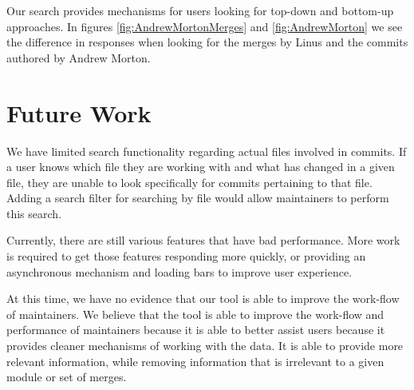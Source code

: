 \documentclass[conference, draftclsnofoot]{IEEEtran}
\begin{document}
Our search provides mechanisms for users looking for top-down and bottom-up
approaches. In figures \ref{fig:AndrewMortonMerges} and \ref{fig:AndrewMorton}
we see the difference in responses when looking for the merges by Linus and the
commits authored by Andrew Morton.


%



\section{Future Work}
We have limited search functionality regarding actual files involved in
commits. If a user knows which file they are working with and what has changed
in a given file, they are unable to look specifically for commits pertaining to
that file. Adding a search filter for searching by file would allow maintainers
to perform this search.

Currently, there are still various features that have bad performance. More
work is required to get those features responding more quickly, or providing an
asynchronous mechanism and loading bars to improve user experience.

At this time, we have no evidence that our tool is able to improve the
work-flow of maintainers. We believe that the tool is able to improve the
work-flow and performance of maintainers because it is able to better assist
users because it provides cleaner mechanisms of working with the data. It is
able to provide more relevant information, while removing information that is
irrelevant to a given module or set of merges.
\end{document}
